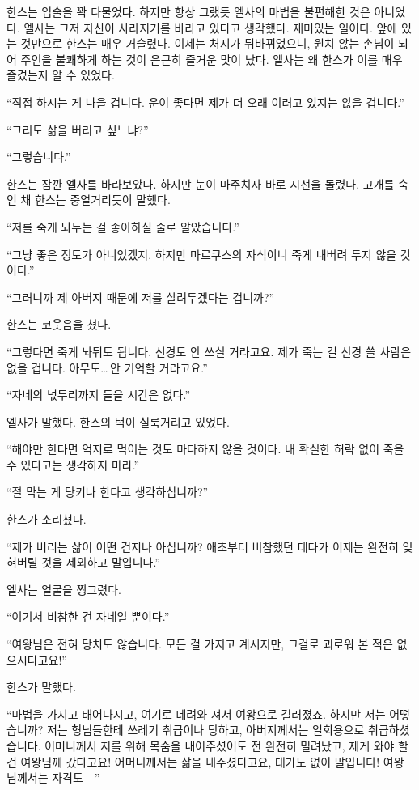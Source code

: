 한스는 입술을 꽉 다물었다. 하지만 항상 그랬듯 엘사의 마법을 불편해한 것은 아니었다. 엘사는 그저 자신이 사라지기를 바라고 있다고 생각했다. 재미있는 일이다. 앞에 있는 것만으로 한스는 매우 거슬렸다. 이제는 처지가 뒤바뀌었으니, 원치 않는 손님이 되어 주인을 불쾌하게 하는 것이 은근히 즐거운 맛이 났다. 엘사는 왜 한스가 이를 매우 즐겼는지 알 수 있었다.

``직접 하시는 게 나을 겁니다. 운이 좋다면 제가 더 오래 이러고 있지는 않을 겁니다.''

``그리도 삶을 버리고 싶느냐?''

``그렇습니다.''

한스는 잠깐 엘사를 바라보았다. 하지만 눈이 마주치자 바로 시선을 돌렸다. 고개를 숙인 채 한스는 중얼거리듯이 말했다.

``저를 죽게 놔두는 걸 좋아하실 줄로 알았습니다.''

``그냥 좋은 정도가 아니었겠지. 하지만 마르쿠스의 자식이니 죽게 내버려 두지 않을 것이다.''

``그러니까 제 아버지 때문에 저를 살려두겠다는 겁니까?''

한스는 코웃음을 쳤다.

``그렇다면 죽게 놔둬도 됩니다. 신경도 안 쓰실 거라고요. 제가 죽는 걸 신경 쓸 사람은 없을 겁니다. 아무도\ldots\,안 기억할 거라고요.''

``자네의 넋두리까지 들을 시간은 없다.''

엘사가 말했다. 한스의 턱이 실룩거리고 있었다.

``해야만 한다면 억지로 먹이는 것도 마다하지 않을 것이다. 내 확실한 허락 없이 죽을 수 있다고는 생각하지 마라.''

``절 막는 게 당키나 한다고 생각하십니까?''

한스가 소리쳤다.

``제가 버리는 삶이 어떤 건지나 아십니까? 애초부터 비참했던 데다가 이제는 완전히 잊혀버릴 것을 제외하고 말입니다.''

엘사는 얼굴을 찡그렸다.

``여기서 비참한 건 자네일 뿐이다.''

``여왕님은 전혀 당치도 않습니다. 모든 걸 가지고 계시지만, 그걸로 괴로워 본 적은 없으시다고요!''

한스가 말했다.

``마법을 가지고 태어나시고, 여기로 데려와 져서 여왕으로 길러졌죠. 하지만 저는 어떻습니까? 저는 형님들한테 쓰레기 취급이나 당하고, 아버지께서는 일회용으로 취급하셨습니다. 어머니께서 저를 위해 목숨을 내어주셨어도 전 완전히 밀려났고, 제게 와야 할 건 여왕님께 갔다고요! 어머니께서는 삶을 내주셨다고요, 대가도 없이 말입니다! 여왕님께서는 자격도—''

